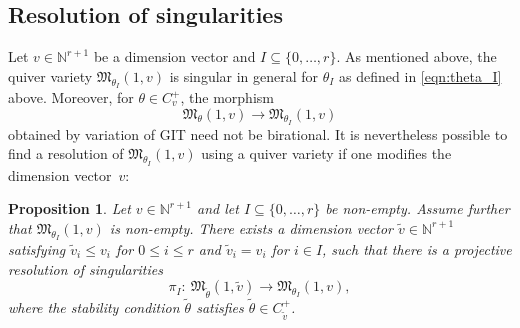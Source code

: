 \documentclass[11pt]{article}
\numberwithin{equation}{section}
\newtheorem{Proposition}[Theorem]{Proposition}
 { \theoremstyle{definition}
\newtheorem{Definition}[Theorem]{Definition}
\newtheorem{Example}[Theorem]{Example}
\newtheorem{Remark}[Theorem]{Remark}
}
\numberwithin{equation}{section}
\begin{document}
\subsection{Resolution of singularities}
Let $v \in \mathbb{N}^{r+1}$ be a dimension vector and $I \subseteq \{0, \dots , r\}$. As mentioned above, the quiver variety $\mathfrak{M}_{\theta_I}(1,v)$ is singular in general for $\theta_I$ as defined in \eqref{eqn:theta_I} above. Moreover, for $\theta\in C_v^+$,
the morphism
\[ \mathfrak{M}_{\theta}(1,v) \to \mathfrak{M}_{\theta_I}(1,v)\]
obtained by variation of GIT need not be birational.
It is nevertheless possible to find a resolution of $\mathfrak{M}_{\theta_I}(1,v)$ using a
quiver variety if one modifies the dimension vector~$v$:

\begin{Proposition}\label{prop:surjvar}
Let $v \in \mathbb{N}^{r+1}$ and let $ I \subseteq \{0, \dots , r\}$ be non-empty. Assume further that
$\mathfrak{M}_{\theta_I}(1,v)$ is non-empty.
There exists a dimension vector $\widetilde{v}\in \mathbb{N}^{r+1}$ satisfying $\widetilde{v}_i \leq v_i$ for $0 \leq i \leq r$ and $\widetilde{v}_i = v_i$ for $i \in I$,
such that there is a projective resolution of singularities
\[
\pi_{I}\colon \ \mathfrak{M}_{\widetilde{\theta}}(1,\widetilde{v})\to \mathfrak{M}_{\theta_I}(1,v),
\]
where the stability condition $\widetilde{\theta}$ satisfies $\widetilde\theta\in C_{\widetilde v}^+$.
\end{Proposition}
\end{document}
